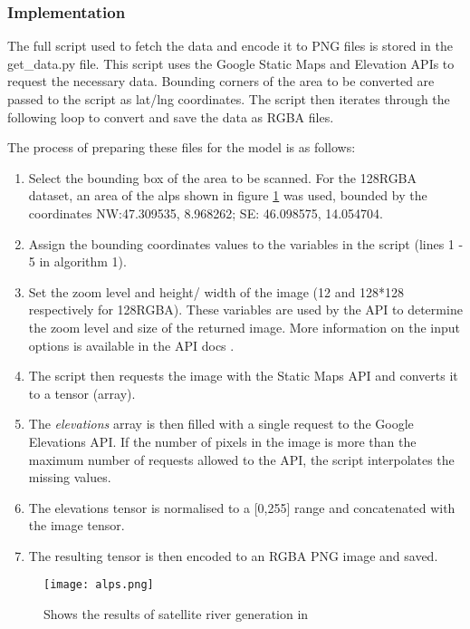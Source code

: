 \documentclass[a4paper]{report}
\begin{document}
\subsubsection{Implementation}
The full script used to fetch the data and encode it to PNG files is stored in the get\_data.py file. This script uses the Google Static Maps and Elevation APIs to request the necessary data. Bounding corners of the area to be converted are passed to the script as lat/lng coordinates. The script then iterates through the following loop to convert and save the data as RGBA files.

The process of preparing these files for the model is as follows:
\begin{enumerate}
    \item Select the bounding box of the area to be scanned. For the 128RGBA dataset, an area of the alps shown in figure \ref{fig:alps} was used, bounded by the coordinates NW:47.309535, 8.968262; SE: 46.098575, 14.054704.
    \item Assign the bounding coordinates values to the variables in the script (lines 1 - 5 in algorithm 1).
    \item Set the zoom level and height/ width of the image (12 and 128*128 respectively for 128RGBA). These variables are used by the API to determine the zoom level and size of the returned image. More information on the input options is available in the API docs \cite{ToDo}.
    \item The script then requests the image with the Static Maps API and converts it to a tensor (array).
    \item The \textit{elevations} array is then filled with a single request to the Google Elevations API. If the number of pixels in the image is more than the maximum number of requests allowed to the API, the script interpolates the missing values.
    \item The elevations tensor is normalised to a [0,255] range and concatenated with the image tensor.
    \item The resulting tensor is then encoded to an RGBA PNG image and saved.
\end{enumerate}

\begin{figure}[H]
    \centering
        \texttt{[image: alps.png]}
        \caption{Shows the results of satellite river generation in}
        \label{fig:alps}
\end{figure}
\end{document}
